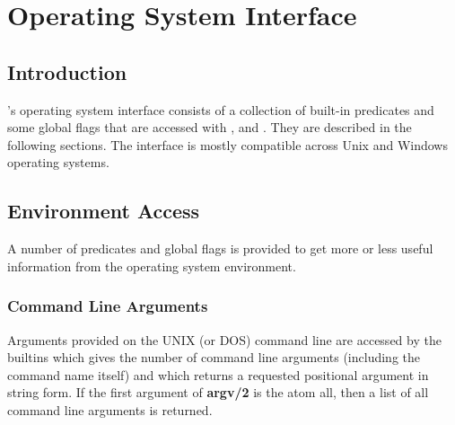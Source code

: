 %
% 
% 
% 
% 
%
%
%
%
%
\chapter{Operating System Interface}
\label{chapopsys}

\section{Introduction}

{\eclipse}'s operating system interface consists of a collection of built-in
predicates and some global flags that are accessed with ,
 and . They are described in the following sections.
The interface is mostly compatible across Unix and Windows operating systems.

\section{Environment Access}
A number of predicates and global flags is provided to get more or less
useful information from the operating system environment.
\subsection{Command Line Arguments}
Arguments provided on the UNIX (or DOS) command line are accessed by the builtins
 which gives the number of command line arguments (including
the command name itself) and  which returns a requested positional
argument in string form. If the first argument of {\bf argv/2} is the atom
all, then a list of all command line arguments is returned.

